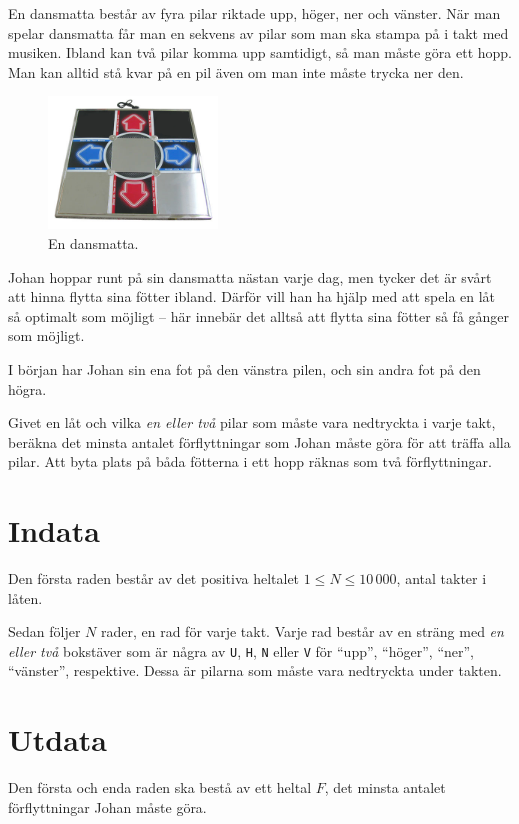 En dansmatta består av fyra pilar riktade upp, höger, ner och vänster.
När man spelar dansmatta får man en sekvens av pilar som man ska stampa på i takt med musiken.
Ibland kan två pilar komma upp samtidigt, så man måste göra ett hopp.
Man kan alltid stå kvar på en pil även om man inte måste trycka ner den.

\begin{figure}[ht!]
\centering
\includegraphics[width=0.4\textwidth]{dansmatta.png}
\caption{En dansmatta.}
\end{figure}

Johan hoppar runt på sin dansmatta nästan varje dag, men tycker det är svårt att hinna flytta sina fötter ibland.
Därför vill han ha hjälp med att spela en låt så optimalt som möjligt -- här innebär det alltså att flytta sina fötter så få gånger som möjligt.

I början har Johan sin ena fot på den vänstra pilen, och sin andra fot på den högra.

Givet en låt och vilka \emph{en eller två} pilar som måste vara nedtryckta i varje takt, beräkna det minsta antalet förflyttningar som Johan måste göra för att träffa alla pilar.
Att byta plats på båda fötterna i ett hopp räknas som två förflyttningar.


\section*{Indata}
Den första raden består av det positiva heltalet $1 \le N \le 10\,000$, antal takter i låten.

Sedan följer $N$ rader, en rad för varje takt. Varje rad består av en sträng med \emph{en eller två} bokstäver som är några av \texttt{U}, \texttt{H}, \texttt{N} eller \texttt{V} för ``upp'', ``höger'', ``ner'', ``vänster'', respektive.
Dessa är pilarna som måste vara nedtryckta under takten.

\section*{Utdata}
Den första och enda raden ska bestå av ett heltal $F$, det minsta antalet förflyttningar Johan måste göra.

